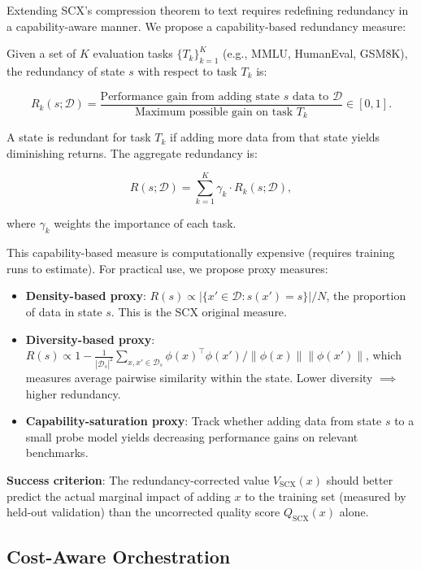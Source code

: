 \documentclass[11pt,twocolumn]{article}
\begin{document}
Extending SCX's compression theorem to text requires redefining redundancy in a capability-aware manner. We propose a capability-based redundancy measure:

Given a set of $K$ evaluation tasks $\{T_k\}_{k=1}^K$ (e.g., MMLU, HumanEval, GSM8K), the redundancy of state $s$ with respect to task $T_k$ is:

\begin{equation}
R_k(s; \mathcal{D}) = \frac{\text{Performance gain from adding state $s$ data to $\mathcal{D}$}}{\text{Maximum possible gain on task $T_k$}} \in [0, 1].
\label{eq:capability_redundancy}
\end{equation}

A state is redundant for task $T_k$ if adding more data from that state yields diminishing returns. The aggregate redundancy is:

\begin{equation}
R(s; \mathcal{D}) = \sum_{k=1}^K \gamma_k \cdot R_k(s; \mathcal{D}),
\label{eq:aggregate_redundancy}
\end{equation}

where $\gamma_k$ weights the importance of each task.

This capability-based measure is computationally expensive (requires training runs to estimate). For practical use, we propose proxy measures:
\begin{itemize}
    \item \textbf{Density-based proxy}: $R(s) \propto |\{x' \in \mathcal{D}: s(x') = s\}| / N$, the proportion of data in state $s$. This is the SCX original measure.
    \item \textbf{Diversity-based proxy}: $R(s) \propto 1 - \frac{1}{|\mathcal{D}_s|^2} \sum_{x,x' \in \mathcal{D}_s} \phi(x)^\top \phi(x') / \|\phi(x)\|\|\phi(x')\|$, which measures average pairwise similarity within the state. Lower diversity $\implies$ higher redundancy.
    \item \textbf{Capability-saturation proxy}: Track whether adding data from state $s$ to a small probe model yields decreasing performance gains on relevant benchmarks.
\end{itemize}

\textbf{Success criterion}: The redundancy-corrected value $V_{\text{SCX}}(x)$ should better predict the actual marginal impact of adding $x$ to the training set (measured by held-out validation) than the uncorrected quality score $Q_{\text{SCX}}(x)$ alone.

\subsection{Cost-Aware Orchestration}
\label{sec:orchestration}
\end{document}
